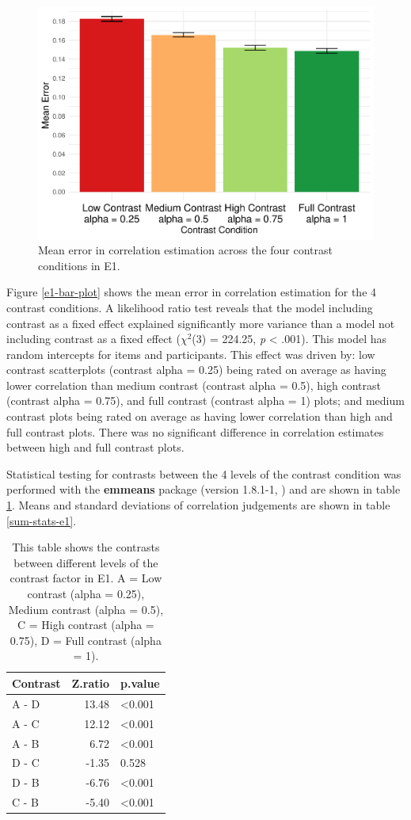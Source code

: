 \documentclass[preprint, 3p,
authoryear]{elsarticle} %
\begin{document}
\begin{figure}

\includegraphics[width=0.5\linewidth]{contrast_and_scatterplots_files/figure-latex/e1-bar-plot-1} \hfill{}

\caption{\label{e1-bar-plot}Mean error in correlation estimation across the four contrast conditions in E1.}\label{fig:e1-bar-plot}
\end{figure}

Figure \ref{e1-bar-plot} shows the mean error in correlation estimation
for the 4 contrast conditions. A likelihood ratio test reveals that the
model including contrast as a fixed effect explained significantly more
variance than a model not including contrast as a fixed effect
(\(\chi^2\)(3) = 224.25, \emph{p} \textless{} .001). This model has
random intercepts for items and participants. This effect was driven by:
low contrast scatterplots (contrast alpha = 0.25) being rated on average
as having lower correlation than medium contrast (contrast alpha = 0.5),
high contrast (contrast alpha = 0.75), and full contrast (contrast alpha
= 1) plots; and medium contrast plots being rated on average as having
lower correlation than high and full contrast plots. There was no
significant difference in correlation estimates between high and full
contrast plots.

Statistical testing for contrasts between the 4 levels of the contrast
condition was performed with the \textbf{emmeans} package (version
1.8.1-1, \citep{emmeans}) and are shown in table
\ref{contrasts-table-e1}. Means and standard deviations of correlation
judgements are shown in table \ref{sum-stats-e1}.

\begin{table}

\caption{\label{tab:contrasts-table-e1}\label{contrasts-table-e1}This table shows the contrasts between different levels of the contrast factor in E1. A = Low contrast (alpha = 0.25), Medium contrast (alpha = 0.5), C = High contrast (alpha = 0.75), D = Full contrast (alpha = 1).}
\centering
\begin{tabular}[t]{lrl}
\toprule
Contrast & Z.ratio & p.value\\
\midrule
A - D & 13.48 & <0.001\\
A - C & 12.12 & <0.001\\
A - B & 6.72 & <0.001\\
D - C & -1.35 & 0.528\\
D - B & -6.76 & <0.001\\
\addlinespace
C - B & -5.40 & <0.001\\
\bottomrule
\end{tabular}
\end{table}
\end{document}
